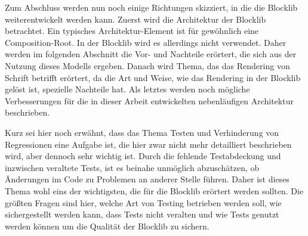 Zum Abschluss werden nun noch einige Richtungen skizziert, in die die Blocklib weiterentwickelt werden kann. Zuerst wird die Architektur der Blocklib betrachtet. Ein typisches Architektur-Element ist für gewöhnlich eine Composition-Root. In der Blocklib wird es allerdings nicht verwendet. Daher werden im folgenden Abschnitt die Vor- und Nachteile erörtert, die sich aus der Nutzung dieses Modells ergeben. Danach wird Thema, das das Rendering von Schrift betrifft erörtert, da die Art und Weise, wie das Rendering in der Blocklib gelöst ist, spezielle Nachteile hat. Als letztes werden noch mögliche Verbesserungen für die in dieser Arbeit entwickelten nebenläufigen Architektur beschrieben.

Kurz sei hier noch erwähnt, dass das Thema Testen und Verhinderung von Regressionen eine Aufgabe ist, die hier zwar nicht mehr detailliert beschrieben wird, aber dennoch sehr wichtig ist. Durch die fehlende Testabdeckung und inzwischen veraltete Tests, ist es beinahe unmöglich abzuschätzen, ob Änderungen im Code zu Problemen an anderer Stelle führen. Daher ist dieses Thema wohl eins der wichtigsten, die für die Blocklib erörtert werden sollten. Die größten Fragen sind hier, welche Art von Testing betrieben werden soll, wie sichergestellt werden kann, dass Tests nicht veralten und wie Tests genutzt werden können um die Qualität der Blocklib zu sichern.